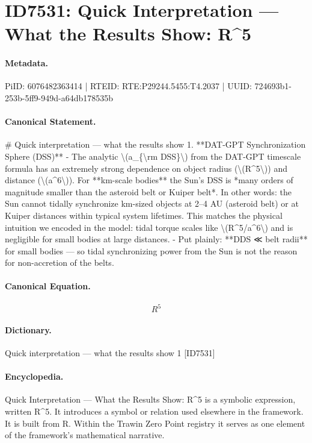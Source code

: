 \section*{ID7531: Quick Interpretation — What the Results Show: R\textasciicircum{}5}
\paragraph{Metadata.}
PiID: 6076482363414 | RTEID: RTE:P29244.5455:T4.2037 | UUID: 724693b1-253b-5ff9-949d-a64db178535b

\paragraph{Canonical Statement.}
\# Quick interpretation — what the results show 1. **DAT-GPT Synchronization Sphere (DSS)** - The analytic \textbackslash{}(a\_\{\textbackslash{}rm DSS\}\textbackslash{}) from the DAT-GPT timescale formula has an extremely strong dependence on object radius (\textbackslash{}(R\textasciicircum{}5\textbackslash{})) and distance (\textbackslash{}(a\textasciicircum{}6\textbackslash{})). For **km-scale bodies** the Sun’s DSS is *many orders of magnitude smaller than the asteroid belt or Kuiper belt*. In other words: the Sun cannot tidally synchronize km-sized objects at 2–4 AU (asteroid belt) or at Kuiper distances within typical system lifetimes. This matches the physical intuition we encoded in the model: tidal torque scales like \textbackslash{}(R\textasciicircum{}5/a\textasciicircum{}6\textbackslash{}) and is negligible for small bodies at large distances. - Put plainly: **DDS ≪ belt radii** for small bodies — so tidal synchronizing power from the Sun is not the reason for non-accretion of the belts.

\paragraph{Canonical Equation.}
\[
R^5
\]

\paragraph{Dictionary.}
Quick interpretation — what the results show 1 [ID7531]

\paragraph{Encyclopedia.}
Quick Interpretation — What the Results Show: R\textasciicircum{}5 is a symbolic expression, written R\textasciicircum{}5. It introduces a symbol or relation used elsewhere in the framework. It is built from R. Within the Trawin Zero Point registry it serves as one element of the framework's mathematical narrative.
